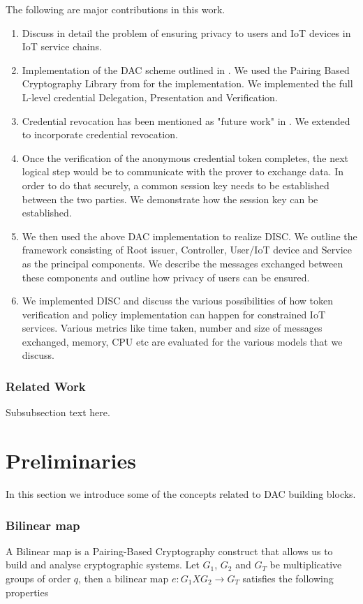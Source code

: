 \documentclass[journal]{IEEEtran}
\begin{document}
The following are major contributions in this work.
\begin{enumerate}[label=\alph*)]
	\item Discuss in detail the problem of ensuring privacy to users and IoT devices in IoT service chains.
	\item Implementation of the DAC scheme outlined in \cite{CamenischDD17}. We used the Pairing Based Cryptography Library from \cite{pbc} for the implementation. We implemented the full L-level credential Delegation, Presentation and Verification.
	\item Credential revocation has been mentioned as "future work" in \cite{CamenischDD17}. We extended \cite{CamenischDD17} to incorporate credential revocation.
	\item Once the verification of the anonymous credential token completes, the next logical step would be to communicate with the prover to exchange data. In order to do that securely, a common session key needs to be established between the two parties. We demonstrate how the session key can be established.
	\item We then used the above DAC implementation to realize DISC. We outline the framework consisting of Root issuer, Controller, User/IoT device and Service as the principal components. We describe the messages exchanged between these components and outline how privacy of users can be ensured.
	\item We implemented DISC and discuss the various possibilities of how token verification and policy implementation can happen for constrained IoT services. Various metrics like time taken, number and size of messages exchanged, memory, CPU etc are evaluated for the various models that we discuss. 
\end{enumerate}

\subsubsection{Related Work}
Subsubsection text here.

\section{Preliminaries} \label{preliminaries}
In this section we introduce some of the concepts related to DAC building blocks. 

\subsubsection{Bilinear map}
A Bilinear map is a Pairing-Based Cryptography construct that allows us to build and analyse cryptographic systems. Let $G_1$, $G_2$ and $G_T$ be multiplicative groups of order $q$, then a bilinear map $e : G_1 X G_2\rightarrow G_T$ satisfies the following properties
\end{document}
